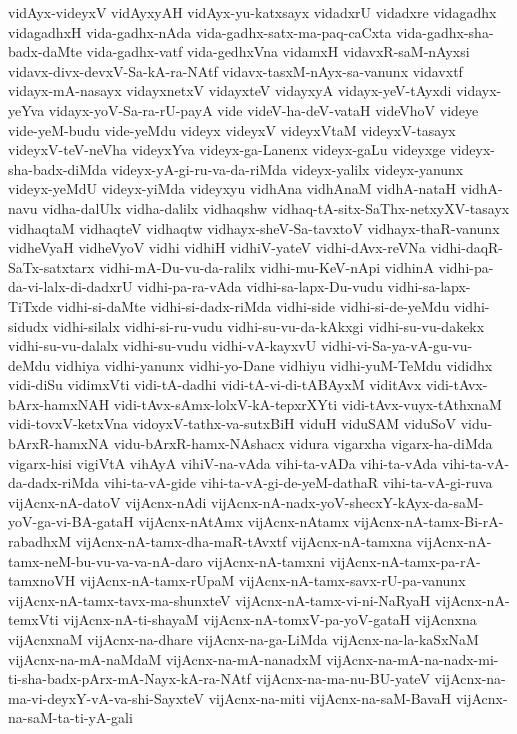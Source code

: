 {vidAyx-videyxV
vidAyxyAH
vidAyx-yu-katxsayx
vidadxrU
vidadxre
vidagadhx
vidagadhxH
vida-gadhx-nAda
vida-gadhx-satx-ma-paq-caCxta
vida-gadhx-sha-badx-daMte
vida-gadhx-vatf
vida-gedhxVna
vidamxH
vidavxR-saM-nAyxsi
vidavx-divx-devxV-Sa-kA-ra-NAtf
vidavx-tasxM-nAyx-sa-vanunx
vidavxtf
vidayx-mA-nasayx
vidayxnetxV
vidayxteV
vidayxyA
vidayx-yeV-tAyxdi
vidayx-yeYva
vidayx-yoV-Sa-ra-rU-payA
vide
videV-ha-deV-vataH
videVhoV
videye
vide-yeM-budu
vide-yeMdu
videyx
videyxV
videyxVtaM
videyxV-tasayx
videyxV-teV-neVha
videyxYva
videyx-ga-Lanenx
videyx-gaLu
videyxge
videyx-sha-badx-diMda
videyx-yA-gi-ru-va-da-riMda
videyx-yalilx
videyx-yanunx
videyx-yeMdU
videyx-yiMda
videyxyu
vidhAna
vidhAnaM
vidhA-nataH
vidhA-navu
vidha-dalUlx
vidha-dalilx
vidhaqshw
vidhaq-tA-sitx-SaThx-netxyXV-tasayx
vidhaqtaM
vidhaqteV
vidhaqtw
vidhayx-sheV-Sa-tavxtoV
vidhayx-thaR-vanunx
vidheVyaH
vidheVyoV
vidhi
vidhiH
vidhiV-yateV
vidhi-dAvx-reVNa
vidhi-daqR-SaTx-satxtarx
vidhi-mA-Du-vu-da-ralilx
vidhi-mu-KeV-nApi
vidhinA
vidhi-pa-da-vi-lalx-di-dadxrU
vidhi-pa-ra-vAda
vidhi-sa-lapx-Du-vudu
vidhi-sa-lapx-TiTxde
vidhi-si-daMte
vidhi-si-dadx-riMda
vidhi-side
vidhi-si-de-yeMdu
vidhi-sidudx
vidhi-silalx
vidhi-si-ru-vudu
vidhi-su-vu-da-kAkxgi
vidhi-su-vu-dakekx
vidhi-su-vu-dalalx
vidhi-su-vudu
vidhi-vA-kayxvU
vidhi-vi-Sa-ya-vA-gu-vu-deMdu
vidhiya
vidhi-yanunx
vidhi-yo-Dane
vidhiyu
vidhi-yuM-TeMdu
vididhx
vidi-diSu
vidimxVti
vidi-tA-dadhi
vidi-tA-vi-di-tABAyxM
viditAvx
vidi-tAvx-bArx-hamxNAH
vidi-tAvx-sAmx-lolxV-kA-tepxrXYti
vidi-tAvx-vuyx-tAthxnaM
vidi-tovxV-ketxVna
vidoyxV-tathx-va-sutxBiH
viduH
viduSAM
viduSoV
vidu-bArxR-hamxNA
vidu-bArxR-hamx-NAshacx
vidura
vigarxha
vigarx-ha-diMda
vigarx-hisi
vigiVtA
vihAyA
vihiV-na-vAda
vihi-ta-vADa
vihi-ta-vAda
vihi-ta-vA-da-dadx-riMda
vihi-ta-vA-gide
vihi-ta-vA-gi-de-yeM-dathaR
vihi-ta-vA-gi-ruva
vijAcnx-nA-datoV
vijAcnx-nAdi
vijAcnx-nA-nadx-yoV-shecxY-kAyx-da-saM-yoV-ga-vi-BA-gataH
vijAcnx-nAtAmx
vijAcnx-nAtamx
vijAcnx-nA-tamx-Bi-rA-rabadhxM
vijAcnx-nA-tamx-dha-maR-tAvxtf
vijAcnx-nA-tamxna
vijAcnx-nA-tamx-neM-bu-vu-va-va-nA-daro
vijAcnx-nA-tamxni
vijAcnx-nA-tamx-pa-rA-tamxnoVH
vijAcnx-nA-tamx-rUpaM
vijAcnx-nA-tamx-savx-rU-pa-vanunx
vijAcnx-nA-tamx-tavx-ma-shunxteV
vijAcnx-nA-tamx-vi-ni-NaRyaH
vijAcnx-nA-temxVti
vijAcnx-nA-ti-shayaM
vijAcnx-nA-tomxV-pa-yoV-gataH
vijAcnxna
vijAcnxnaM
vijAcnx-na-dhare
vijAcnx-na-ga-LiMda
vijAcnx-na-la-kaSxNaM
vijAcnx-na-mA-naMdaM
vijAcnx-na-mA-nanadxM
vijAcnx-na-mA-na-nadx-mi-ti-sha-badx-pArx-mA-Nayx-kA-ra-NAtf
vijAcnx-na-ma-nu-BU-yateV
vijAcnx-na-ma-vi-deyxY-vA-va-shi-SayxteV
vijAcnx-na-miti
vijAcnx-na-saM-BavaH
vijAcnx-na-saM-ta-ti-yA-gali
}
